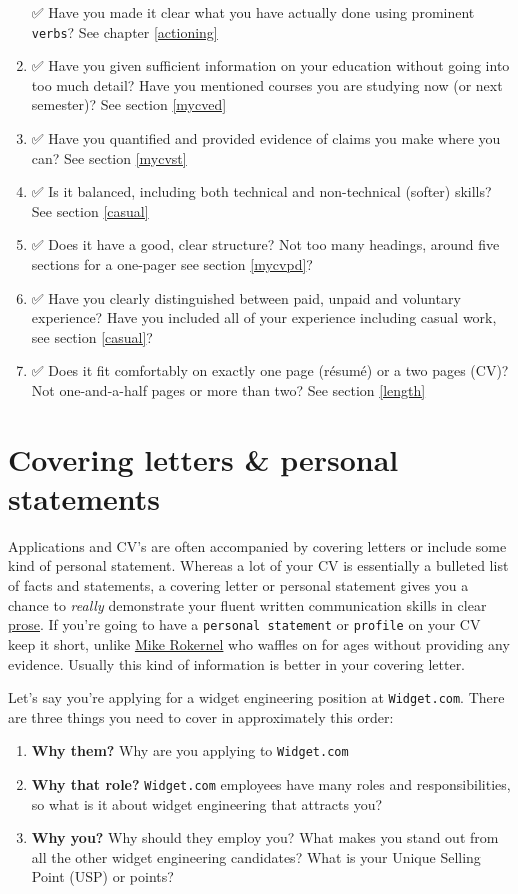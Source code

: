 \documentclass[
]{book}
\providecommand{\tightlist}{%
  \setlength{\itemsep}{0pt}\setlength{\parskip}{0pt}}
\begin{document}
\begin{enumerate}
  ✅ Have you made it clear what you have actually done using prominent \texttt{verbs}? See chapter \ref{actioning}
\item
  ✅ Have you given sufficient information on your education without going into too much detail? Have you mentioned courses you are studying now (or next semester)? See section \ref{mycved}
\item
  ✅ Have you quantified and provided evidence of claims you make where you can? See section \ref{mycvst}
\item
  ✅ Is it balanced, including both technical and non-technical (softer) skills? See section \ref{casual}
\item
  ✅ Does it have a good, clear structure? Not too many headings, around five sections for a one-pager see section \ref{mycvpd}?
\item
  ✅ Have you clearly distinguished between paid, unpaid and voluntary experience? Have you included all of your experience including casual work, see section \ref{casual}?
\item
  ✅ Does it fit comfortably on exactly one page (résumé) or a two pages (CV)? Not one-and-a-half pages or more than two? See section \ref{length}
\end{enumerate}

\hypertarget{we3qs}{%
\section{Covering letters \& personal statements}\label{we3qs}}

Applications and CV's are often accompanied by covering letters or include some kind of personal statement. Whereas a lot of your CV is essentially a bulleted list of facts and statements, a covering letter or personal statement gives you a chance to \emph{really} demonstrate your fluent written communication skills in clear \href{https://en.wikipedia.org/wiki/Prose}{prose}. If you're going to have a \texttt{personal\ statement} or \texttt{profile} on your CV keep it short, unlike \href{https://www.cdyf.me/mike_rokernel.pdf}{Mike Rokernel} who waffles on for ages without providing any evidence. Usually this kind of information is better in your covering letter.

Let's say you're applying for a widget engineering position at \texttt{Widget.com}. There are three things you need to cover in approximately this order:

\begin{enumerate}
\def\labelenumi{\arabic{enumi}.}
\tightlist
\item
  \textbf{Why them?} Why are you applying to \texttt{Widget.com}
\item
  \textbf{Why that role?} \texttt{Widget.com} employees have many roles and responsibilities, so what is it about widget engineering that attracts you?
\item
  \textbf{Why you?} Why should they employ you? What makes you stand out from all the other widget engineering candidates? What is your Unique Selling Point (USP) or points?
\end{enumerate}
\end{document}
